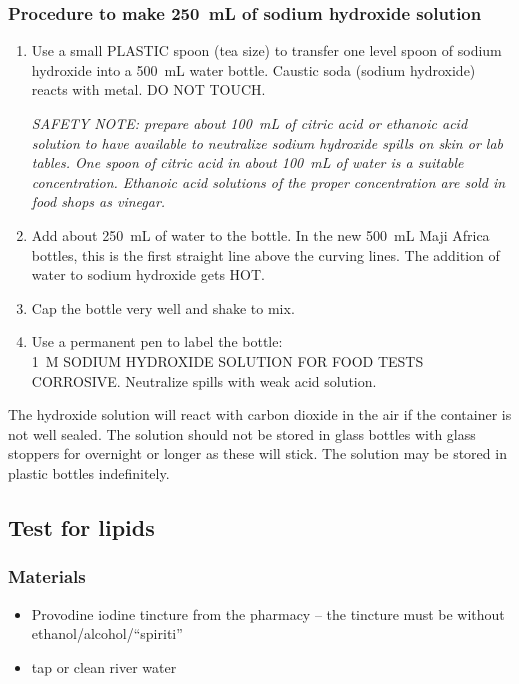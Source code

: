 \subsubsection{Procedure to make 250~mL of sodium hydroxide solution}
\begin{enumerate}
\item{Use a small PLASTIC spoon (tea size) to transfer one level spoon of sodium hydroxide into a 500~mL water bottle. Caustic soda (sodium hydroxide) reacts with metal. DO NOT TOUCH.

\textit{SAFETY NOTE: prepare about 100~mL of citric acid or ethanoic acid solution to have available to neutralize sodium hydroxide spills on skin or lab tables. One spoon of citric acid in about 100~mL of water is a suitable concentration. Ethanoic acid solutions of the proper concentration are sold in food shops as vinegar.}

}%

\item{Add about 250~mL of water to the bottle. In the new 500~mL Maji Africa bottles, this is the first straight line above the curving lines. The addition of water to sodium hydroxide gets HOT.}
\item{Cap the bottle very well and shake to mix.}
\item{Use a permanent pen to label the bottle:\\
1~M SODIUM HYDROXIDE SOLUTION FOR FOOD TESTS\\
CORROSIVE. Neutralize spills with weak acid solution.}
\end{enumerate}

The hydroxide solution will react with carbon dioxide in the air if the container is not well sealed. The solution should not be stored in glass bottles with glass stoppers for overnight or longer as these will stick. The solution may be stored in plastic bottles indefinitely.

\subsection{Test for lipids}

\subsubsection{Materials}
\begin{itemize}
\item{Provodine iodine tincture from the pharmacy -- the tincture must be without ethanol\slash alcohol\slash ``spiriti''}
\item{tap or clean river water}
\end{itemize}

